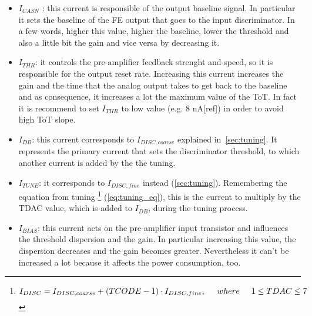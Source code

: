 \begin{itemize}
\label{currents}
\item \textit{$I_{CASN}$} : this current is responsible of the output baseline signal. In particular it sets the baseline of the FE output that goes to the input discriminator. In a few words, higher this value, higher the baseline, lower the threshold and also a little bit the gain and vice versa by decreasing it.
\item \textit{$I_{THR}$}: it controls the pre-amplifier feedback strenght and speed, so it is responsible for the output reset rate. Increasing this current increases the gain and the time that the analog output takes to get back to the baseline and as consequence, it increases a lot the maximum value of the ToT. In fact it is recommend to set $I_{THR}$ to low value (e.g. 8 nA[ref]) in order to avoid high ToT slope.
\item \textit{$I_{DB}$}: this current corresponds to \textbf{$I_{DISC,coarse}$} explained in~\autoref{sec:tuning}. It represents the primary current that sets the discriminator threshold, to which another current is added by the the tuning.
\item \textit{$I_{TUNE}$}: it corresponds to \textbf{$I_{DISC,fine}$} instead (\autoref{sec:tuning}). Remembering the equation from tuning \footnote{
\begin{equation}
I_{DISC} = I_{DISC, coarse} + (TCODE - 1) \cdot I_{DISC,fine},  \hspace{.5cm}	where \hspace{.5cm} 1 \leq TDAC \leq 7
\end{equation}
} (\autoref{eq:tuning_eq}), this is the current to multiply by the TDAC value, which is added to $I_{DB}$, during the tuning process.
\item \textit{$I_{BIAS}$}: this current acts on the pre-amplifier input transistor and influences the threshold dispersion and the gain. In particular increasing this value, the dispersion decreases and the gain becomes greater. Nevertheless it can't be increased a lot because it affects the power consumption, too. %
\end{itemize}

\begin{comment}
pag.97 tesi
This modification has significant consequences in several design aspects such as the bandwidth, gain, noise and threshold dispersion resulting in a different front-end behavior
\end{comment}

